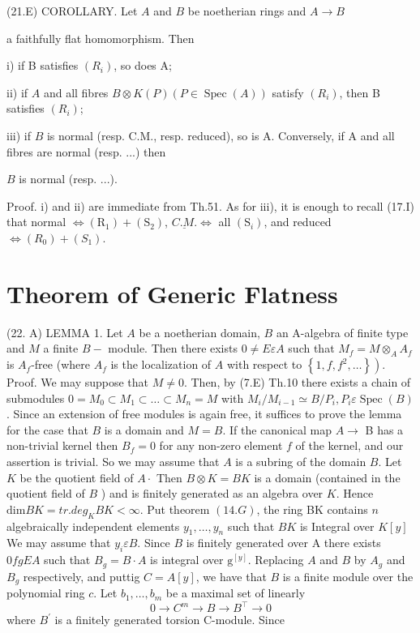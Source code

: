 (21.E) COROLLARY. Let $A$ and $B$ be noetherian rings and $A \rightarrow B$

a faithfully flat homomorphism. Then

i) if B satisfies $\left(R_{i}\right)$, so does A;

ii) if $A$ and all fibres $B \otimes K(P)(P \in \operatorname{Spec}(A))$ satisfy $\left(R_{i}\right)$, then B satisfies $\left(R_{i}\right)$;

iii) if $B$ is normal (resp. C.M., resp. reduced), so is A. Conversely, if A and all fibres are normal (resp. ...) then

$B$ is normal (resp. ...).

Proof. i) and ii) are immediate from Th.51. As for iii), it is enough to recall (17.I) that normal $\Leftrightarrow\left(\mathrm{R}_{1}\right)+\left(\mathrm{S}_{2}\right)$, $\underline{C . M .} \Leftrightarrow$ all $\left(\mathrm{S}_{i}\right)$, and reduced $\Leftrightarrow\left(R_{0}\right)+\left(S_{1}\right)$.

\section{Theorem of Generic Flatness}
(22. A) LEMMA 1. Let $A$ be a noetherian domain, $B$ an A-algebra of finite type and $M$ a finite $B-$ module. Then there exists $0 \neq E \varepsilon A$ such that $M_{f}=M \otimes_{A} A_{f}$ is $A_{f}$-free (where $A_{f}$ is the localization of $A$ with respect to $\left.\left\{1, f, f^{2}, \ldots\right\}\right)$. Proof. We may suppose that $M \neq 0$. Then, by (7.E) Th.10 there exists a chain of submodules $0=M_{0} \subset M_{1} \subset \ldots \subset M_{n}=M$ with $M_{i} / M_{i-1} \simeq B / P_{i}, P_{i} \varepsilon \operatorname{Spec}(B)$. Since an extension of free modules is again free, it suffices to prove the lemma for the case that $B$ is a domain and $M=B$. If the canonical map $A \rightarrow$ B has a non-trivial kernel then $B_{f}=0$ for any non-zero element $f$ of the kernel, and our assertion is trivial. So we may assume that $A$ is a subring of the domain $B$. Let $K$ be the quotient field of $A \cdot$ Then $B \otimes K=B K$ is a domain (contained in the quotient field of $B$ ) and is finitely generated as an algebra over $K$. Hence $\mathrm{dim} B K=t r . d e g_{K} B K<\infty .$ Put theorem $(14 . G)$, the ring BK contains $n$ algebraically independent elements $y_{1}, \ldots, y_{n}$ such that $B K$ is Integral over $K[y]$ We may assume that $y_{i} \varepsilon B$. Since $B$ is finitely generated over A there exists $0 f g E A$ such that $B_{g}=B \cdot A$ is integral over $\mathrm{g}^{[y]}$. Replacing $A$ and $B$ by $A_{g}$ and $B_{g}$ respectively, and puttig $C=A[y]$, we have that $B$ is a finite module over the polynomial ring $c$. Let $b_{1}, \ldots, b_{m}$ be a maximal set of linearly
$$
0 \rightarrow C^{m} \rightarrow B \rightarrow B^{\top} \rightarrow 0
$$
where $B^{\prime}$ is a finitely generated torsion C-module. Since

